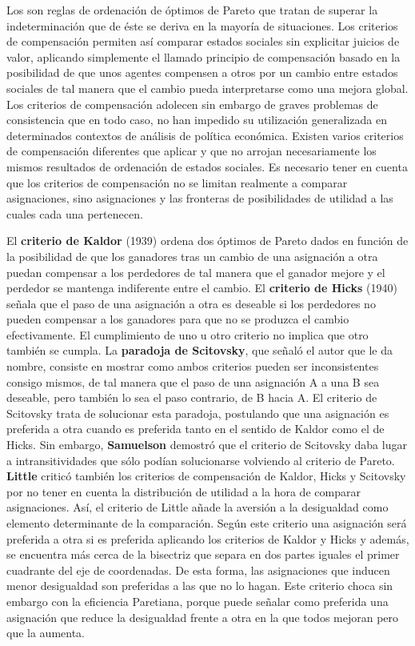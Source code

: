 \documentclass{nuevotema}
\begin{document}
Los  son reglas de ordenación de óptimos de Pareto que tratan de superar la indeterminación que de éste se deriva en la mayoría de situaciones. Los criterios de compensación permiten así comparar estados sociales sin explicitar juicios de valor, aplicando simplemente el llamado principio de compensación basado en la posibilidad de que unos agentes compensen a otros por un cambio entre estados sociales de tal manera que el cambio pueda interpretarse como una mejora global. Los criterios de compensación adolecen sin embargo de graves problemas de consistencia que en todo caso, no han impedido su utilización generalizada en determinados contextos de análisis de política económica. Existen varios criterios de compensación diferentes que aplicar y que no arrojan necesariamente los mismos resultados de ordenación de estados sociales. Es necesario tener en cuenta que los criterios de compensación no se limitan realmente a comparar asignaciones, sino asignaciones y las fronteras de posibilidades de utilidad a las cuales cada una pertenecen. 

El \textbf{criterio de Kaldor} (1939) ordena dos óptimos de Pareto dados en función de la posibilidad de que los ganadores tras un cambio de una asignación a otra puedan compensar a los perdedores de tal manera que el ganador mejore y el perdedor se mantenga indiferente entre el cambio. El \textbf{criterio de Hicks} (1940) señala que el paso de una asignación a otra es deseable si los perdedores no pueden compensar a los ganadores para que no se produzca el cambio efectivamente. El cumplimiento de uno u otro criterio no implica que otro también se cumpla. La \textbf{paradoja de Scitovsky}, que señaló el autor que le da nombre, consiste en mostrar como ambos criterios pueden ser inconsistentes consigo mismos, de tal manera que el paso de una asignación A a una B sea deseable, pero también lo sea el paso contrario, de B hacia A. El criterio de Scitovsky trata de solucionar esta paradoja, postulando que una asignación es preferida a otra cuando es preferida tanto en el sentido de Kaldor como el de Hicks. Sin embargo, \textbf{Samuelson} demostró que el criterio de Scitovsky daba lugar a intransitividades que sólo podían solucionarse volviendo al criterio de Pareto. \textbf{Little} criticó también los criterios de compensación de Kaldor, Hicks y Scitovsky por no tener en cuenta la distribución de utilidad a la hora de comparar asignaciones. Así, el criterio de Little añade la aversión a la desigualdad como elemento determinante de la comparación. Según este criterio una asignación será preferida a otra si es preferida aplicando los criterios de Kaldor y Hicks y además, se encuentra más cerca de la bisectriz que separa en dos partes iguales el primer cuadrante del eje de coordenadas. De esta forma, las asignaciones que inducen menor desigualdad son preferidas a las que no lo hagan. Este criterio choca sin embargo con la eficiencia Paretiana, porque puede señalar como preferida una asignación que reduce la desigualdad frente a otra en la que todos mejoran pero que la aumenta.
\end{document}
